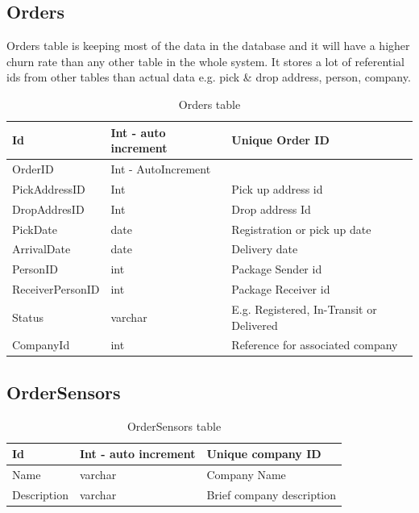 \subsection{Orders}
Orders table is keeping most of the data in the database and it will have a higher churn rate than any other table in the whole system. It stores a lot of referential ids from other tables than actual data e.g. pick \& drop address, person, company. 

\begin{table}[!ht]
\begin{center}
\begin{tabular}{ |l|l|l| } 
 \hline
Id & Int - auto increment & Unique Order ID \\
 \hline

OrderID & Int - AutoIncrement  & \\
\hline
PickAddressID & Int & Pick up address id\\
\hline
DropAddresID  & Int  & Drop address Id\\
\hline
PickDate  & date & Registration or pick up date\\
\hline
ArrivalDate & date & Delivery date\\
\hline
PersonID & int & Package Sender id\\
\hline
ReceiverPersonID & int & Package Receiver id\\
\hline
Status & varchar & E.g. Registered, In-Transit or Delivered\\
\hline
CompanyId & int & Reference for associated company\\

 \hline
\end{tabular}
\end{center}
    \caption{Orders table}
\end{table}

\subsection{OrderSensors}


\begin{table}[!ht]
\begin{center}
\begin{tabular}{ |l|l|l| } 
 \hline
Id & Int - auto increment & Unique company ID \\
 \hline
Name & varchar & Company Name \\
 \hline
Description & varchar & Brief company description \\
 \hline
\end{tabular}
\end{center}
    \caption{OrderSensors table}
\end{table}

